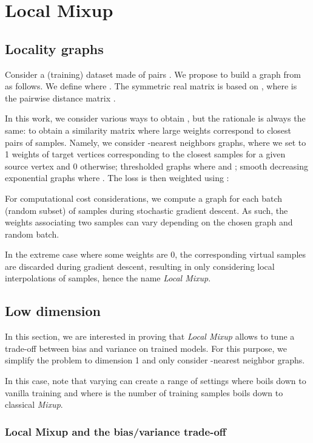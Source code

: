 \documentclass[twoside]{article}
\numberwithin{intassumption}{assumption}
\begin{document}
\section{Local Mixup}



\subsection{Locality graphs}
Consider a (training) dataset  made of pairs . We propose to build a graph from  as follows. We define  where . The symmetric real matrix  is based on , where  is the pairwise distance matrix .

In this work, we consider various ways to obtain , but the rationale is always the same: to obtain a similarity matrix where large weights correspond to closest pairs of samples. Namely, we consider -nearest neighbors graphs, where we set to 1 weights of target vertices corresponding to the  closest samples for a given source vertex and 0 otherwise; thresholded graphs where  and ; smooth decreasing exponential graphs where . The loss is then weighted using : 
  
For computational cost considerations, we compute a graph for each batch (random subset) of samples during stochastic gradient descent. As such, the weights associating two samples can vary depending on the chosen graph and random batch.

In the extreme case where some weights are 0, the corresponding virtual samples are discarded during gradient descent, resulting in only considering local interpolations of samples, hence the name \emph{Local Mixup}.

\subsection{Low dimension}

In this section, we are interested in proving that \emph{Local Mixup} allows to tune a trade-off between bias and variance on trained models. For this purpose, we simplify the problem to dimension 1 and only consider -nearest neighbor graphs.

In this case, note that varying  can create a range of settings where  boils down to vanilla training and  where  is the number of training samples boils down to classical \emph{Mixup}.

\subsubsection{Local Mixup and the bias/variance trade-off}
\end{document}
